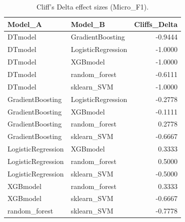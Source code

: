 \begin{table}[t]
\centering
\begin{tabular}{llr}
\toprule
Model_A & Model_B & Cliffs_Delta \\
\midrule
DTmodel & GradientBoosting & -0.9444 \\
DTmodel & LogisticRegression & -1.0000 \\
DTmodel & XGBmodel & -1.0000 \\
DTmodel & random_forest & -0.6111 \\
DTmodel & sklearn_SVM & -1.0000 \\
GradientBoosting & LogisticRegression & -0.2778 \\
GradientBoosting & XGBmodel & -0.1111 \\
GradientBoosting & random_forest & 0.2778 \\
GradientBoosting & sklearn_SVM & -0.6667 \\
LogisticRegression & XGBmodel & 0.3333 \\
LogisticRegression & random_forest & 0.5000 \\
LogisticRegression & sklearn_SVM & -0.5000 \\
XGBmodel & random_forest & 0.3333 \\
XGBmodel & sklearn_SVM & -0.6667 \\
random_forest & sklearn_SVM & -0.7778 \\
\bottomrule
\end{tabular}
\caption{Cliff's Delta effect sizes (Micro_F1).}
\label{tab:cliffs_Micro_F1}
\end{table}